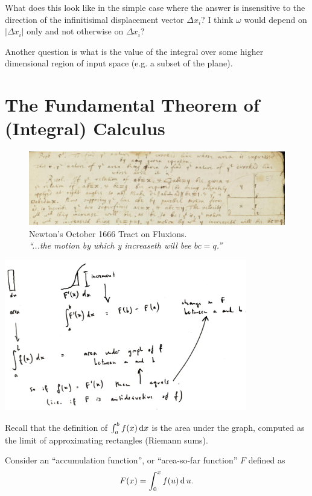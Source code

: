 What does this look like in the simple case where the answer is insensitive to
the direction of the infinitisimal displacement vector $\Delta x_i$? I think
$\omega$ would depend on $|\Delta x_i|$ only and not otherwise on $\Delta x_i$?

Another question is what is the value of the integral over some higher
dimensional region of input space (e.g. a subset of the plane).

\newpage
\section{The Fundamental Theorem of (Integral) Calculus}

\begin{figure}[h]
\centering
\includegraphics[width=500pt]{img/newton-october-1666-tract-ftc.png}
\captionsetup{labelformat=empty,justification=centering}
\caption[xxx]{Newton's October 1666 Tract on Fluxions.\\
  \emph{``...the motion by which y increaseth will bee $bc = q$.''}}
\end{figure}

\includegraphics[width=300pt]{img/ftc.png}

Recall that the definition of $\int_a^b f(x) \dx$ is the area under the graph,
computed as the limit of approximating rectangles (Riemann sums).

Consider an ``accumulation function'', or ``area-so-far function'' $F$ defined
as
\begin{align*}
  F(x) = \int_0^x f(u) \operatorname{\text{d}} u.
\end{align*}

